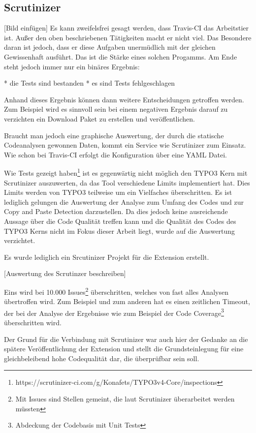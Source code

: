 \subsection{Scrutinizer}
[Bild einfügen]
Es kann zweifelsfrei gesagt werden, dass Travis-CI das Arbeitstier ist. Außer den oben beschriebenen Tätigkeiten macht er nicht viel. Das Besondere daran ist jedoch, dass er diese Aufgaben unermüdlich mit der gleichen Gewissenhaft ausführt. Das ist die Stärke eines solchen Progamms. Am Ende steht jedoch immer nur ein binäres Ergebnis:

* die Tests sind bestanden
* es sind Tests fehlgeschlagen

Anhand dieses Ergebnis können dann weitere Entscheidungen getroffen werden. Zum Beispiel wird es sinnvoll sein bei einem negativen Ergebnis darauf zu verzichten ein Download Paket zu erstellen und veröffentlichen.

Braucht man jedoch eine graphische Auswertung, der durch die statische Codeanalysen gewonnen Daten, kommt ein Service wie Scrutinizer zum Einsatz. Wie schon bei Travis-CI erfolgt die Konfiguration über eine YAML Datei.

Wie Tests gezeigt haben\footnote{https://scrutinizer-ci.com/g/Konafets/TYPO3v4-Core/inspections} ist es gegenwärtig nicht möglich den TYPO3 Kern mit Scrutinizer auszuwerten, da das Tool verschiedene Limits implementiert hat. Dies Limits werden von TYPO3 teilweise um ein Vielfaches überschritten. Es ist lediglich gelungen die Auswertung der Analyse zum Umfang des Codes und zur Copy and Paste Detection darzustellen. Da dies jedoch keine ausreichende Aussage über die Code Qualität treffen kann und die Qualität des Codes des TYPO3 Kerns nicht im Fokus dieser Arbeit liegt, wurde auf die Auswertung verzichtet.

Es wurde lediglich ein Srcutinizer Projekt für die Extension erstellt.

[Auswertung des Scrutinzer beschreiben]

Eins wird bei 10.000 Issues\footnote{Mit Issues sind Stellen gemeint, die laut Scrutinizer überarbeitet werden müssten} überschritten, welches von fast alles Analysen übertroffen wird. Zum Beispiel und zum anderen hat es einen zeitlichen Timeout, der bei der Analyse der Ergebnisse wie zum Beispiel der Code Coverage\footnote{Abdeckung der Codebasis mit Unit Tests} überschritten wird.

Der Grund für die Verbindung mit Scrutinizer war auch hier der Gedanke an die spätere Veröffentlichung der Extension und stellt die Grundsteinlegung für eine gleichbeleibend hohe Codequalität dar, die überprüfbar sein soll.

